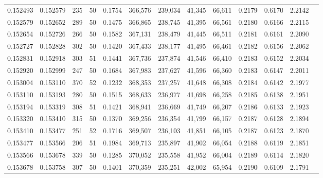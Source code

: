 \begin{tabular}{rrrrrrrrrrrrr}
0.152493 & 0.152579 &   235 &  50 &                                     0.1754 & 366,576 & 239,034 &  41,345 &  66,611 & 0.2179 & 0.6170 & 2.2142 \\
0.152579 & 0.152652 &   289 &  50 &                                     0.1475 & 366,865 & 238,745 &  41,395 &  66,561 & 0.2180 & 0.6166 & 2.2115 \\
0.152654 & 0.152726 &   266 &  50 &                                     0.1582 & 367,131 & 238,479 &  41,445 &  66,511 & 0.2181 & 0.6161 & 2.2090 \\
0.152727 & 0.152828 &   302 &  50 &                                     0.1420 & 367,433 & 238,177 &  41,495 &  66,461 & 0.2182 & 0.6156 & 2.2062 \\
0.152831 & 0.152918 &   303 &  51 &                                     0.1441 & 367,736 & 237,874 &  41,546 &  66,410 & 0.2183 & 0.6152 & 2.2034 \\
0.152920 & 0.152999 &   247 &  50 &                                     0.1684 & 367,983 & 237,627 &  41,596 &  66,360 & 0.2183 & 0.6147 & 2.2011 \\
0.153004 & 0.153110 &   370 &  52 &                                     0.1232 & 368,353 & 237,257 &  41,648 &  66,308 & 0.2184 & 0.6142 & 2.1977 \\
0.153110 & 0.153193 &   280 &  50 &                                     0.1515 & 368,633 & 236,977 &  41,698 &  66,258 & 0.2185 & 0.6138 & 2.1951 \\
0.153194 & 0.153319 &   308 &  51 &                                     0.1421 & 368,941 & 236,669 &  41,749 &  66,207 & 0.2186 & 0.6133 & 2.1923 \\
0.153320 & 0.153410 &   315 &  50 &                                     0.1370 & 369,256 & 236,354 &  41,799 &  66,157 & 0.2187 & 0.6128 & 2.1894 \\
0.153410 & 0.153477 &   251 &  52 &                                     0.1716 & 369,507 & 236,103 &  41,851 &  66,105 & 0.2187 & 0.6123 & 2.1870 \\
0.153477 & 0.153566 &   206 &  51 &                                     0.1984 & 369,713 & 235,897 &  41,902 &  66,054 & 0.2188 & 0.6119 & 2.1851 \\
0.153566 & 0.153678 &   339 &  50 &                                     0.1285 & 370,052 & 235,558 &  41,952 &  66,004 & 0.2189 & 0.6114 & 2.1820 \\
0.153678 & 0.153758 &   307 &  50 &                                     0.1401 & 370,359 & 235,251 &  42,002 &  65,954 & 0.2190 & 0.6109 & 2.1791 \\

\end{tabular}
